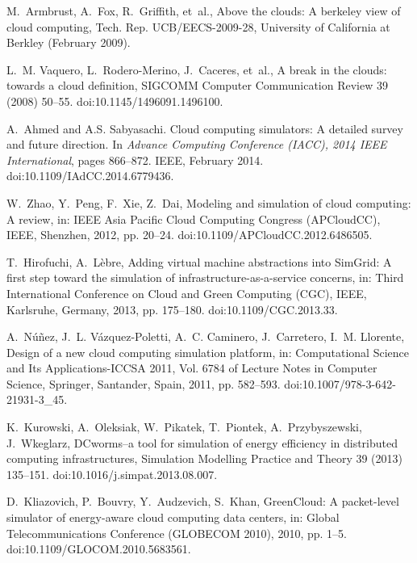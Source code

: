 \documentclass[sort, compress, 5p]{elsarticle}
\begin{document}
\begin{thebibliography}{10}

M.~Armbrust, A.~Fox, R.~Griffith, et~al., Above the clouds: A berkeley view of
  cloud computing, Tech. Rep. UCB/EECS-2009-28, University of California at
  Berkley (February 2009).

L.~M. Vaquero, L.~Rodero-Merino, J.~Caceres, et~al., A break in the clouds:
  towards a cloud definition, SIGCOMM Computer Communication Review 39 (2008)
  50--55.
\newblock doi:10.1145/1496091.1496100.

A.~Ahmed and A.S. Sabyasachi.
\newblock Cloud computing simulators: A detailed survey and future direction.
\newblock In {\em Advance Computing Conference (IACC), 2014 IEEE
	International}, pages 866--872. IEEE, February 2014.
\newblock doi:10.1109/IAdCC.2014.6779436.

W.~Zhao, Y.~Peng, F.~Xie, Z.~Dai, Modeling and simulation of cloud computing: A
  review, in: IEEE Asia Pacific Cloud Computing Congress (APCloudCC), IEEE,
  Shenzhen, 2012, pp. 20--24.
\newblock doi:10.1109/APCloudCC.2012.6486505.

T.~Hirofuchi, A.~L{\`e}bre, Adding virtual machine abstractions into {SimGrid}:
  A first step toward the simulation of infrastructure-as-a-service concerns,
  in: Third International Conference on Cloud and Green Computing (CGC), IEEE,
  Karlsruhe, Germany, 2013, pp. 175--180.
\newblock doi:10.1109/CGC.2013.33.

A.~N{\'u}{\~n}ez, J.~L. V{\'a}zquez-Poletti, A.~C. Caminero, J.~Carretero,
  I.~M. Llorente, Design of a new cloud computing simulation platform, in:
  Computational Science and Its Applications-ICCSA 2011, Vol. 6784 of Lecture
  Notes in Computer Science, Springer, Santander, Spain, 2011, pp. 582--593.
\newblock doi:10.1007/978-3-642-21931-3\_45.

K.~Kurowski, A.~Oleksiak, W.~Pi{k{a}}tek, T.~Piontek, A.~Przybyszewski,
  J.~W{k{e}}glarz, {DCworms}--a tool for simulation of energy efficiency in
  distributed computing infrastructures, Simulation Modelling Practice and
  Theory 39 (2013) 135--151.
\newblock doi:10.1016/j.simpat.2013.08.007.

D.~Kliazovich, P.~Bouvry, Y.~Audzevich, S.~Khan, {GreenCloud}: A packet-level
  simulator of energy-aware cloud computing data centers, in: Global
  Telecommunications Conference (GLOBECOM 2010), 2010, pp. 1--5.
\newblock doi:10.1109/GLOCOM.2010.5683561.


\end{thebibliography}
\end{document}
